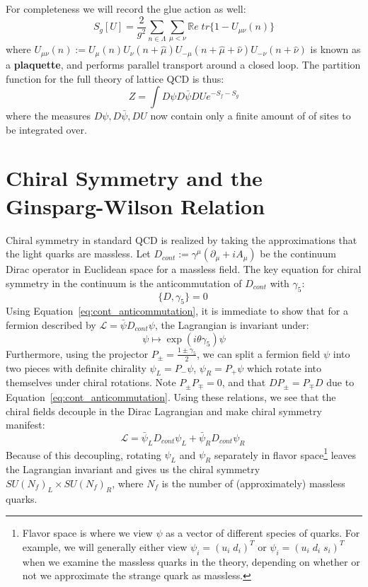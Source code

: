 \documentclass[11pt, oneside]{article}   	%
\theoremstyle{definition}
\begin{document}
For completeness we will record the glue action as well:
\begin{equation}
	S_{g}[U] = \frac{2}{g^2}\sum_{n\in\Lambda}\sum_{\mu < \nu}\mathbb Re\; tr\{1 - U_{\mu\nu}(n)\}
\end{equation}
where $U_{\mu\nu}(n) := U_\mu(n) U_\nu(n + \hat\mu) U_{-\mu}(n + \hat\mu + \hat\nu) U_{-\nu}(n + \hat\nu)$ is known as a \textbf{plaquette}, 
and performs parallel transport around a closed loop. The partition function for the full theory of lattice QCD is thus:
\begin{equation}
	Z = \int D\psi D\bar\psi D U e^{-S_f - S_g}
\end{equation}
where the measures $D\psi, D\bar\psi, DU$ now contain only a finite amount of of sites to be integrated over. 

\section{Chiral Symmetry and the Ginsparg-Wilson Relation}

Chiral symmetry in standard QCD is realized by taking the approximations that the light quarks are massless. 
Let $D_{cont} := \gamma^\mu (\partial_\mu + i A_\mu)$ be the continuum Dirac operator in Euclidean space for a massless field. The key equation 
for chiral symmetry in the continuum is the anticommutation of $D_{cont}$ with $\gamma_5$:
\begin{equation}
	\{D, \gamma_5\} = 0~
	\label{eq:cont_anticommutation}
\end{equation}
Using Equation~\ref{eq:cont_anticommutation}, it is immediate to show that for a fermion described by $\mathcal L = \bar\psi D_{cont}\psi$, 
the Lagrangian is invariant under:
\begin{equation}
	\psi\mapsto \exp(i\theta\gamma_5)\psi
\end{equation}
Furthermore, using the projector $P_\pm = \frac{1\pm\gamma_5}{2}$, we can split a fermion field $\psi$ into two pieces with definite 
chirality $\psi_L = P_-\psi$, $\psi_R = P_+\psi$ which rotate into themselves under chiral rotations. Note $P_\pm P_\mp = 0$, and that 
$DP_\pm = P_\mp D$ due to Equation~\ref{eq:cont_anticommutation}. Using these relations, we 
see that the chiral fields decouple in the Dirac Lagrangian and make chiral symmetry manifest:
\begin{equation}
	\mathcal L = \bar\psi_L D_{cont}\psi_L + \bar\psi_R D_{cont}\psi_R~
	\label{eq:cont_chiral_lagrangian}
\end{equation}
Because of this decoupling, rotating $\psi_L$ and $\psi_R$ separately in flavor space\footnote{Flavor space is where we view 
$\psi$ as a vector of different species of quarks. For example, we will generally either view $\psi_i = (u_i\; d_i)^T$ or 
$\psi_i = (u_i\; d_i\; s_i)^T$ when we examine the massless quarks in the theory, depending on whether or not we approximate 
the strange quark as massless.} leaves the Lagrangian invariant and gives us the chiral symmetry $SU(N_f)_L\times SU(N_f)_R$, 
where $N_f$ is the number of (approximately) massless quarks. 
\end{document}
